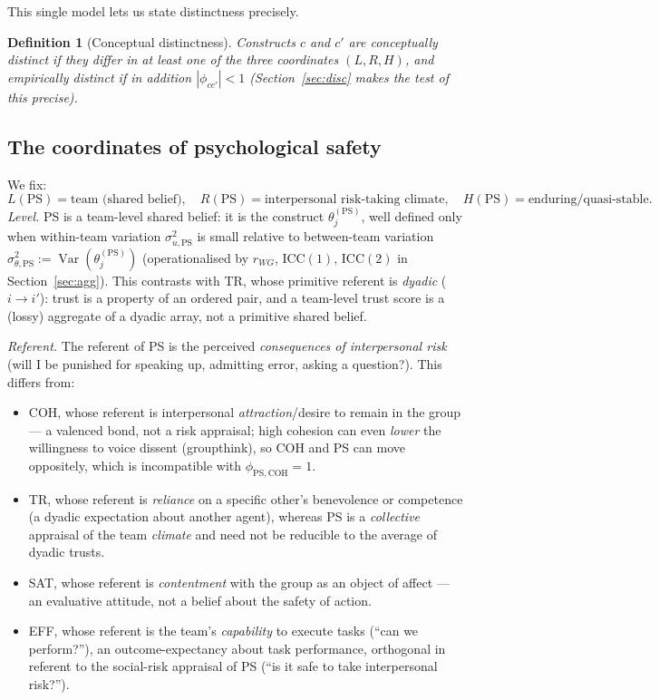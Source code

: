 \documentclass{amsart}
\newtheorem{definition}{Definition}
\theoremstyle{remark}
\begin{document}
This single model lets us state distinctness precisely.

\begin{definition}[Conceptual distinctness]\label{def:distinct}
Constructs $c$ and $c'$ are \emph{conceptually distinct} if they differ in at least
one of the three coordinates $(L,R,H)$, and \emph{empirically distinct} if in
addition $|\phi_{cc'}|<1$ (Section~\ref{sec:disc} makes the test of this precise).
\end{definition}

\subsection{The coordinates of psychological safety}
We fix:
\[
L(\mathrm{PS})=\text{team (shared belief)},\quad
R(\mathrm{PS})=\text{interpersonal risk-taking climate},\quad
H(\mathrm{PS})=\text{enduring/quasi-stable}.
\]
\emph{Level.} PS is a team-level shared belief: it is the construct
$\theta^{(\mathrm{PS})}_j$, well defined only when within-team variation
$\sigma^2_{u,\mathrm{PS}}$ is small relative to between-team variation
$\sigma^2_{\theta,\mathrm{PS}}:=\operatorname{Var}(\theta^{(\mathrm{PS})}_j)$
(operationalised by $r_{WG}$, $\mathrm{ICC}(1)$, $\mathrm{ICC}(2)$ in
Section~\ref{sec:agg}). This contrasts with TR, whose primitive referent is
\emph{dyadic} ($i\to i'$): trust is a property of an ordered pair, and a team-level
trust score is a (lossy) aggregate of a dyadic array, not a primitive shared
belief.

\emph{Referent.} The referent of PS is the perceived \emph{consequences of
interpersonal risk} (will I be punished for speaking up, admitting error, asking a
question?). This differs from:
\begin{itemize}
\item COH, whose referent is interpersonal \emph{attraction}/desire to remain in
the group --- a valenced bond, not a risk appraisal; high cohesion can even
\emph{lower} the willingness to voice dissent (groupthink), so COH and PS can move
oppositely, which is incompatible with $\phi_{\mathrm{PS},\mathrm{COH}}=1$.
\item TR, whose referent is \emph{reliance} on a specific other's benevolence or
competence (a dyadic expectation about another agent), whereas PS is a
\emph{collective} appraisal of the team \emph{climate} and need not be reducible to
the average of dyadic trusts.
\item SAT, whose referent is \emph{contentment} with the group as an object of
affect --- an evaluative attitude, not a belief about the safety of action.
\item EFF, whose referent is the team's \emph{capability} to execute tasks
(``can we perform?''), an outcome-expectancy about task performance, orthogonal in
referent to the social-risk appraisal of PS (``is it safe to take interpersonal
risk?'').
\end{itemize}
\end{document}
